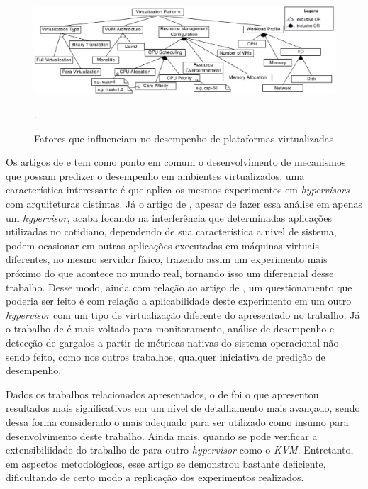 \begin{figure}[!htb]
\centering
\includegraphics [keepaspectratio=true,scale=0.50]{figuras/factors_influence.eps}
\caption{Fatores que influenciam no desempenho de plataformas virtualizadas}
\cite{huber2011}.
\label{influence_factors}
\end{figure} 

Os artigos de  e  tem como ponto em comum o desenvolvimento de mecanismos que possam predizer o desempenho em ambientes virtualizados, uma característica interessante é que  aplica os mesmos experimentos em \textit{hypervisors} com arquiteturas distintas. Já o artigo de , apesar de fazer essa análise em apenas um \textit{hypervisor}, acaba focando na interferência que determinadas aplicações utilizadas no cotidiano, dependendo de sua característica a nivel de sistema, podem ocasionar em outras aplicações executadas em máquinas virtuais diferentes, no mesmo servidor físico, trazendo assim um experimento mais próximo do que acontece no mundo real, tornando isso um diferencial desse trabalho. Desse modo, ainda com relação ao artigo de , um questionamento que poderia ser feito é com relação a aplicabilidade deste experimento em um outro \textit{hypervisor} com um tipo de virtualização diferente do apresentado no trabalho. Já o trabalho de  é mais voltado para monitoramento, análise de desempenho e detecção de gargalos a partir de métricas nativas do sistema operacional não sendo feito, como nos outros trabalhos, qualquer iniciativa de predição de desempenho.

Dados os trabalhos relacionados apresentados, o de  foi o que apresentou resultados mais significativos em um nível de detalhamento mais avançado, sendo dessa forma considerado o mais adequado para ser utilizado como insumo para desenvolvimento deste trabalho. Ainda mais, quando se pode verificar a extensibiliidade do trabalho de  para outro \textit{hypervisor} como o \textit{KVM}. Entretanto, em aspectos metodológicos, esse artigo se demonstrou bastante deficiente, dificultando de certo modo a replicação dos experimentos realizados. %


